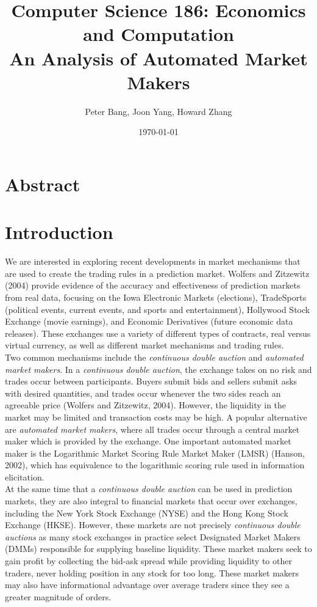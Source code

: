 \documentclass[11pt,a4paper]{article}
\begin{document}
\author{Peter Bang, Joon Yang, Howard Zhang}
\title{Computer Science 186: Economics and Computation \\ An Analysis of Automated Market Makers}
\date{\today}
\maketitle
\section*{Abstract}
\section*{Introduction}
We are interested in exploring recent developments in market mechanisms that are used to create the trading rules in a prediction market. Wolfers and Zitzewitz (2004) provide evidence of the accuracy and effectiveness of prediction markets from real data, focusing on the Iowa Electronic Markets (elections), TradeSports (political events, current events, and sports and entertainment), Hollywood Stock Exchange (movie earnings), and Economic Derivatives (future economic data releases). These exchanges use a variety of different types of contracts, real versus virtual currency, as well as different market mechanisms and trading rules. \\

Two common mechanisms include the \emph{continuous double auction} and \emph{automated market makers}. In a \emph{continuous double auction}, the exchange takes on no risk and trades occur between participants. Buyers submit bids and sellers submit asks with desired quantities, and trades occur whenever the two sides reach an agreeable price (Wolfers and Zitzewitz, 2004). However, the liquidity in the market may be limited and transaction costs may be high. A popular alternative are \emph{automated market makers}, where all trades occur through a central market maker which is provided by the exchange. One important automated market maker is the Logarithmic Market Scoring Rule Market Maker (LMSR) (Hanson, 2002), which has equivalence to the logarithmic scoring rule used in information elicitation. \\ 

At the same time that a \emph{continuous double auction} can be used in prediction markets, they are also integral to financial markets that occur over exchanges, including the New York Stock Exchange (NYSE) and the Hong Kong Stock Exchange (HKSE). However, these markets are not precisely \emph{continuous double auctions} as many stock exchanges in practice select Designated Market Makers (DMMs) responsible for supplying baseline liquidity. These market makers seek to gain profit by collecting the bid‐ask spread while providing liquidity to other traders, never holding position in any stock for too long. These market makers may also have informational advantage over average traders since they see a greater magnitude of orders. \\
\end{document}
